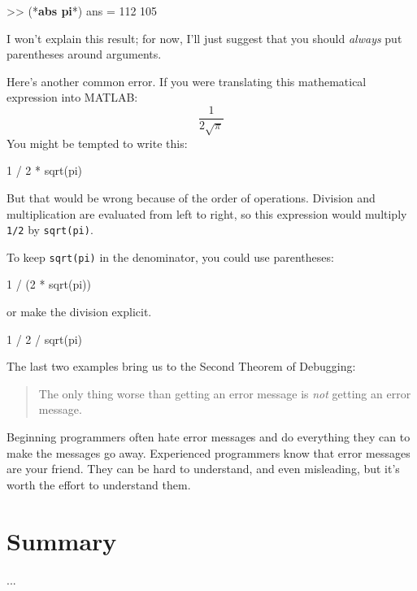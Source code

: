 \begin{code}
>> (*\textbf{abs pi}*)
ans =  112   105
\end{code}

I won't explain this result; for now, I'll just suggest that you should \emph{always} put parentheses around arguments.


Here's another common error.
If you were translating this mathematical expression into MATLAB:
%
\[ \frac{1}{2 \sqrt \pi} \]
%
You might be tempted to write this:

\begin{code}
1 / 2 * sqrt(pi)
\end{code}

But that would be wrong because of the order of operations.  Division and multiplication are evaluated from left to right, so this expression would multiply \lstinline{1/2} by \lstinline{sqrt(pi)}.


To keep \lstinline{sqrt(pi)} in the denominator, you could use parentheses:

\begin{code}
1 / (2 * sqrt(pi))
\end{code}

or make the division explicit.

\begin{code}
1 / 2 / sqrt(pi)
\end{code}


The last two examples bring us to the Second Theorem of Debugging:

\begin{quote}
The only thing worse than getting an error message is \emph{not} getting an error message.
\end{quote}

Beginning programmers often hate error messages and do everything they
can to make the messages go away.  Experienced programmers know that error
messages are your friend.  They can be hard to understand, and even
misleading, but it's worth the effort to understand them.



\section{Summary}
...

